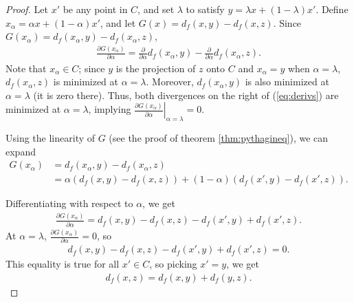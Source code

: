 \documentclass{article}
\begin{document}
\begin{proof}
Let $x'$ be any point in $C$, and set $\lambda$ to satisfy 
$y=\lambda x+ (1-\lambda) x'$.  
Define $x_\alpha = \alpha x + (1-\alpha)
x'$, and let $G(x) = d_f(x,y) - d_f(x,z)$.  Since $G(x_\alpha) =
d_f(x_\alpha,y) - d_f(x_\alpha,z)$,
\begin{align}
\frac{\partial G(x_\alpha)}{\partial \alpha} =
\frac{\partial}{\partial \alpha} d_f(x_\alpha,y) -
\frac{\partial}{\partial \alpha} d_f(x_\alpha,z). \label{eq:derivs}
\end{align}
Note that $x_{\alpha}\in C$; since $y$ is the projection of $z$ onto
$C$ and $x_\alpha = y$ when $\alpha=\lambda$, $d_f(x_\alpha,z)$ is
minimized at $\alpha=\lambda$.  Moreover, $d_f(x_\alpha,y)$ is also
minimized at $\alpha=\lambda$ (it is zero there).  Thus, both 
divergences on the right of (\ref{eq:derivs}) are minimized at
$\alpha=\lambda$, implying $\left. \frac{\partial
  G(x_\alpha)}{\partial \alpha} \right|_{\alpha = \lambda} = 0$.

Using the linearity of $G$ (see the proof of theorem
\ref{thm:pythagineq}), we can expand 
\begin{align*} 
G(x_\alpha) &= d_f(x_\alpha,y) - d_f(x_\alpha,z) \\
&= \alpha (d_f(x,y) - d_f(x,z)) + (1-\alpha) (d_f(x',y) - d_f(x',z)).
\end{align*}

Differentiating with respect to $\alpha$, we get
\begin{align*}
\frac{\partial G(x_\alpha)}{\partial \alpha} = d_f(x,y)-d_f(x,z) - d_f(x',y)
+ d_f(x',z).
\end{align*}
At $\alpha=\lambda$, $\frac{\partial G(x_\alpha)}{\partial \alpha}=0$,
so
\begin{align*}
d_f(x,y)-d_f(x,z) - d_f(x',y)
+ d_f(x',z)=0.
\end{align*}
This equality is true for all $x' \in C$, so picking $x'=y$, we get 
\begin{align*}
d_f(x,z) = d_f(x,y) + d_f(y,z).
\end{align*}
\end{proof}
\end{document}
